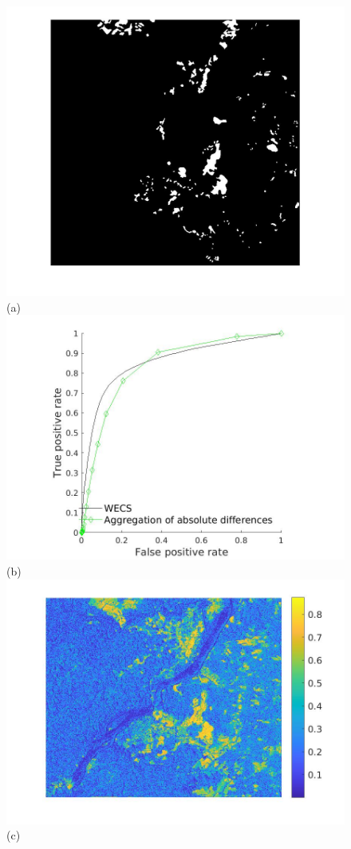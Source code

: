 \documentclass[journal]{IEEEtran}
\begin{document}
\begin{figure}[htp!]
\centering
\includegraphics[scale=.10]{../../figs/forest_change}\hspace{-.5cm}(a)
\includegraphics[scale=.15]{../../figs/forest_roc_change}\hspace{-.5cm}(b)\\
\includegraphics[scale=.13]{../../figs/forest_wecs_abscorr}\hspace{-.5cm}(c)

\end{figure}
\end{document}

